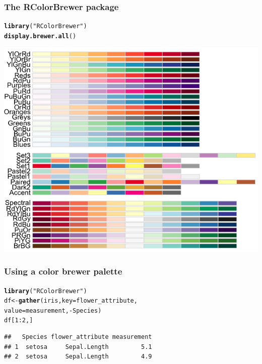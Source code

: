 \documentclass{beamer}\usepackage[]{graphicx}\usepackage[]{color}
\makeatletter
\newcommand{\hlnum}[1]{\textcolor[rgb]{0.686,0.059,0.569}{#1}}%
\newcommand{\hlstr}[1]{\textcolor[rgb]{0.192,0.494,0.8}{#1}}%
\newcommand{\hlopt}[1]{\textcolor[rgb]{0,0,0}{#1}}%
\newcommand{\hlstd}[1]{\textcolor[rgb]{0.345,0.345,0.345}{#1}}%
\newcommand{\hlkwb}[1]{\textcolor[rgb]{0.69,0.353,0.396}{#1}}%
\newcommand{\hlkwc}[1]{\textcolor[rgb]{0.333,0.667,0.333}{#1}}%
\newcommand{\hlkwd}[1]{\textcolor[rgb]{0.737,0.353,0.396}{\textbf{#1}}}%
\newenvironment{kframe}{%
 \def\at@end@of@kframe{}%
 \ifinner\ifhmode%
  \def\at@end@of@kframe{\end{minipage}}%
  \begin{minipage}{\columnwidth}%
 \fi\fi%
 \def\FrameCommand##1{\hskip\@totalleftmargin \hskip-\fboxsep
 \colorbox{shadecolor}{##1}\hskip-\fboxsep
     \hskip-\linewidth \hskip-\@totalleftmargin \hskip\columnwidth}%
 \MakeFramed {\advance\hsize-\width
   \@totalleftmargin\z@ \linewidth\hsize
   \@setminipage}}%
 {\par\unskip\endMakeFramed%
 \at@end@of@kframe}
\newenvironment{knitrout}{}{} %
\makeatother
\begin{document}
\begin{frame}[fragile]
\frametitle{The RColorBrewer package}
\begin{knitrout}\footnotesize
{}\color{fgcolor}\begin{kframe}
\begin{alltt}
\hlkwd{library}\hlstd{(}\hlstr{"RColorBrewer"}\hlstd{)}
\hlkwd{display.brewer.all}\hlstd{()}
\end{alltt}
\end{kframe}
\end{knitrout}
\begin{center}
\includegraphics[scale=0.25]{images/color_palette.png}
\end{center}
\end{frame}


\begin{frame}[fragile]
\frametitle{Using a color brewer palette}
\begin{knitrout}\footnotesize
{}\color{fgcolor}\begin{kframe}
\begin{alltt}
\hlkwd{library}\hlstd{(}\hlstr{"RColorBrewer"}\hlstd{)}
\hlstd{df} \hlkwb{<-} \hlkwd{gather}\hlstd{(iris,} \hlkwc{key} \hlstd{= flower_attribute,}
                         \hlkwc{value} \hlstd{= measurement,} \hlopt{-}\hlstd{Species)}
\hlstd{df[}\hlnum{1}\hlopt{:}\hlnum{2}\hlstd{,]}
\end{alltt}
\begin{verbatim}
##   Species flower_attribute measurement
## 1  setosa     Sepal.Length         5.1
## 2  setosa     Sepal.Length         4.9
\end{verbatim}
\end{kframe}
\end{knitrout}
\end{frame}
\end{document}
